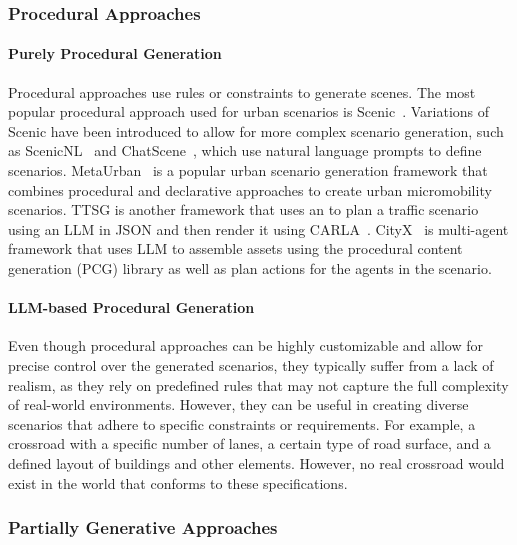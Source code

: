 \documentclass{article}
\begin{document}
\subsubsection{Procedural Approaches}

\paragraph{Purely Procedural Generation}

Procedural approaches use rules or constraints to generate scenes. The most popular procedural approach used for urban scenarios is Scenic~\cite{fremont2019scenic}. Variations of Scenic have been introduced to allow for more complex scenario generation, such as ScenicNL~\cite{elmaaroufi2024scenicnl} and ChatScene~\cite{zhang2024chatscene}, which use natural language prompts to define scenarios. MetaUrban~\cite{wu2024metaurban} is a popular urban scenario generation framework that combines procedural and declarative approaches to create urban micromobility scenarios. TTSG\cite{ruan2024traffic} is another framework that uses an to plan a traffic scenario using an LLM in JSON and then render it using CARLA~\cite{dosovitskiy2017carla}. CityX~\cite{zhang2024cityx} is multi-agent framework that uses LLM to assemble assets using the procedural content generation (PCG) library as well as plan actions for the agents in the scenario.

\paragraph{LLM-based Procedural Generation}

Even though procedural approaches can be highly customizable and allow for precise control over the generated scenarios, they typically suffer from a lack of realism, as they rely on predefined rules that may not capture the full complexity of real-world environments. However, they can be useful in creating diverse scenarios that adhere to specific constraints or requirements. For example, a crossroad with a specific number of lanes, a certain type of road surface, and a defined layout of buildings and other elements. However, no real crossroad would exist in the world that conforms to these specifications.

\subsubsection{Partially Generative Approaches}
\end{document}
